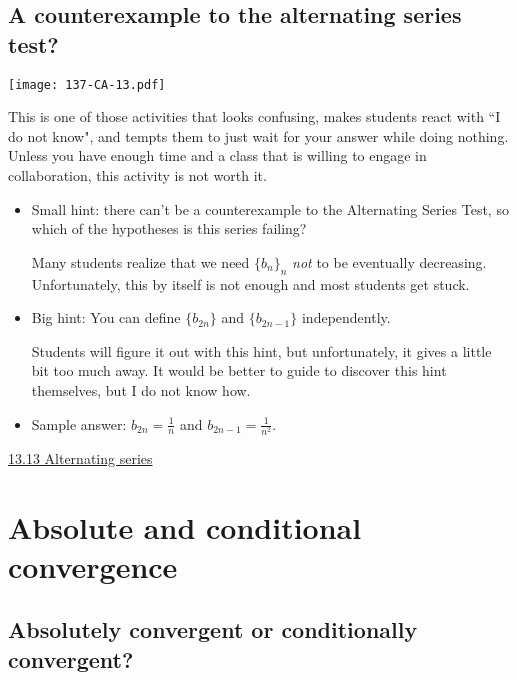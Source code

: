\documentclass[11pt]{article}
\newcommand {\DS} [1] {${\displaystyle #1}$}
\newcommand{\nl}{\hfill \vspace{-1.1\baselineskip}} %
\newcommand{\vxiii}{\hspace{8mm} \href{https://www.youtube.com/watch?v=OM9U6Pwze8E&list=PLlwePzQY_wW-FJMnD_ybkXU_jZLVtZttI&index=13}{13.13 Alternating series} }
\begin{document}
\subsection{A counterexample to the alternating series test?}

\begin{center}
{ \texttt{[image: 137-CA-13.pdf]}} 
\end{center}

\begin{warning}
	This is one of those activities that looks confusing, makes students react with ``I do not know", and tempts them to just wait for your answer while doing nothing.  Unless you have enough time and a class that is willing to engage in collaboration, this activity is not worth it.
\end{warning}

\begin{comments}
\nl
	\begin{itemize}
		\item  Small hint: there can't be a counterexample to the Alternating Series Test, so which of the hypotheses is this series failing?

		Many students realize that we need \DS{\{b_n \}_n} \emph{not} to be eventually decreasing.  Unfortunately, this by itself is not enough and most students get stuck.
		
		\item Big hint: You can define \DS{\{b_{2n}\}} and \DS{\{b_{2n-1}\}} independently.
		
		Students will figure it out with this hint, but unfortunately, it gives a little bit too much away.  It would be better to guide to discover this hint themselves, but I do not know how.
		
		\item Sample answer: \DS{b_{2n} = \frac{1}{n}} and \DS{b_{2n-1} = \frac{1}{n^2}}.
	\end{itemize}
\end{comments}

\begin{videos}
\vxiii
\end{videos}

\newpage
\section{Absolute and conditional convergence}
\subsection{Absolutely convergent or conditionally convergent?}
\end{document}
